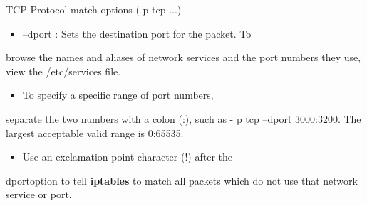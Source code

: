 \begin{frame}[t,allowframebreaks]{TCP Protocol match options (-p tcp ...)}
  \fontsize{15}{18}\selectfont
  \begin{itemize}
    \item --dport : Sets the destination port for the packet. To
  \end{itemize}
  browse the names and aliases of network services and the port numbers they use, view the /etc/services file.\par
  \begin{itemize}
    \item To specify a specific range of port numbers,
  \end{itemize}
  separate the two numbers with a colon (:), such as - p tcp --dport 3000:3200. The largest acceptable valid range is 0:65535.\par
  \begin{itemize}
    \item Use an exclamation point character (!) after the --
  \end{itemize}
  dportoption to tell \textcolor{CommandGreen}{\bfseries iptables} to match all packets which do not use that network service or port.\par
\end{frame}
